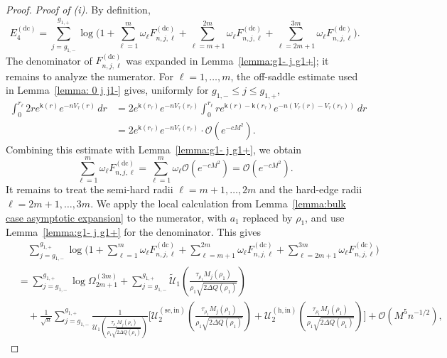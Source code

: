 \documentclass[a4paper]{article}
\numberwithin{equation}{section}
\begin{document}
\begin{proof}
\emph{Proof of (i).}
By definition,
\[
E_4^{(\mathrm{dc})}
=\sum_{j=g_{1,-}}^{g_{1,+}}\log\Big(
1+\sum_{\ell=1}^{m}\omega_{\ell}F_{n,j,\ell}^{(\mathrm{dc})}
+\sum_{\ell=m+1}^{2m}\omega_{\ell}F_{n,j,\ell}^{(\mathrm{dc})}
+\sum_{\ell=2m+1}^{3m}\omega_{\ell}F_{n,j,\ell}^{(\mathrm{dc})}
\Bigr). 
\]
The denominator of $F_{n,j,\ell}^{(\mathrm{dc})}$ was expanded in
Lemma~\ref{lemma:g1- j g1+}; it remains to analyze the numerator.
For $\ell=1,\ldots,m$, the off-saddle estimate used in
Lemma~\ref{lemma: 0 j j1-} gives, uniformly for
$g_{1,-}\leq j\leq g_{1,+}$,
\begin{align*}
\int _{0}^{r_{\ell}}2r e^{\mathsf{k}(r)}e^{-nV_{\tau}(r)}\,dr
&=
2e^{\mathsf{k}(r_{\tau})}e^{-nV_{\tau}(r_{\tau})}
\int_{0}^{r_{\ell}}r e^{\mathsf{k}(r)-\mathsf{k}(r_{\tau})}
e^{-n(V_{\tau}(r)-V_{\tau}(r_{\tau}))}\,dr
\\
&=
2e^{\mathsf{k}(r_{\tau})}e^{-nV_{\tau}(r_{\tau})}\cdot \mathcal{O}(e^{-cM^2}). 
\end{align*}
Combining this estimate with Lemma~\ref{lemma:g1- j g1+}, we obtain
\[
\sum_{\ell=1}^{m}\omega_{\ell}F_{n,j,\ell}^{(\mathrm{dc})}
=
\sum_{\ell=1}^m \omega_{\ell}\mathcal{O}(e^{-cM^2})=\mathcal{O}(e^{-cM^2}). 
\]
It remains to treat the semi-hard radii
$\ell=m+1,\ldots,2m$ and the hard-edge radii
$\ell=2m+1,\ldots,3m$.  We apply the local calculation from
Lemma~\ref{lemma:bulk case asymptotic expansion} to the numerator, with
$a_1$ replaced by $\rho_1$, and use Lemma~\ref{lemma:g1- j g1+} for the
denominator.  This gives
\begin{align*}
&\quad\sum_{j=g_{1,-}}^{g_{1,+}}\log\Big(
1+\sum_{\ell=1}^{m}\omega_{\ell}F_{n,j,\ell}^{(\mathrm{dc})}
+\sum_{\ell=m+1}^{2m}\omega_{\ell}F_{n,j,\ell}^{(\mathrm{dc})}
+\sum_{\ell=2m+1}^{3m}\omega_{\ell}F_{n,j,\ell}^{(\mathrm{dc})}
\Bigr)
\\
&=
\sum_{j=g_{1,-}}^{g_{1,+}}\log\Omega_{2m+1}^{(3m)}
+
\sum_{j=g_{1,-}}^{g_{1,+}}
\widetilde{\mathscr{U}}_{1}(\tfrac{\tau_{\rho_1}M_j(\rho_1)}{\rho_1\sqrt{2\Delta Q(\rho_1)}})
\\
&\quad
+\frac{1}{\sqrt{n}}
\sum_{j=g_{1,-}}^{g_{1,+}}
\frac{1}{\mathscr{U}_{1}(\tfrac{\tau_{\rho_1}M_j(\rho_1)}{\rho_1\sqrt{2\Delta Q(\rho_1)}})}
\bigg[
\mathscr{U}_{2}^{(\mathrm{se},\mathrm{in})}(\tfrac{\tau_{\rho_1}M_j(\rho_1)}{\rho_1\sqrt{2\Delta Q(\rho_1)}})
+
\mathscr{U}_{2}^{(\mathrm{h,in})}(\tfrac{\tau_{\rho_1}M_j(\rho_1)}{\rho_1\sqrt{2\Delta Q(\rho_1)}})
\bigg]
+
\mathcal{O}(M^5n^{-1/2}), 
\end{align*}

\end{proof}
\end{document}
